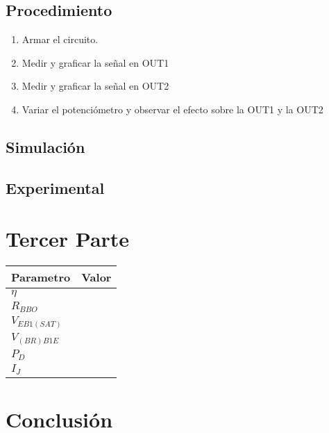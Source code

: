 \subsection{Procedimiento}
\begin{enumerate}
  \item Armar el circuito.
  \item Medir y graficar la señal en OUT1
  \item Medir y graficar la señal en OUT2
  \item Variar el potenciómetro y observar el efecto sobre la OUT1 y la OUT2 
\end{enumerate}
\subsection{Simulación}
\subsection{Experimental}

\section{Tercer Parte}
\begin{center}
  \begin{tabular}{l|c}
    Parametro &Valor \\ 
    \hline
    $\eta$          &  \\
    $R_{BBO}$       &  \\
    $V_{EB1(SAT)}$  &  \\
    $V_{(BR)B1E}$   &  \\
    $P_D$           &  \\
    $I_J$           &  
 \end{tabular} 
\end{center}

\section{Conclusión}

